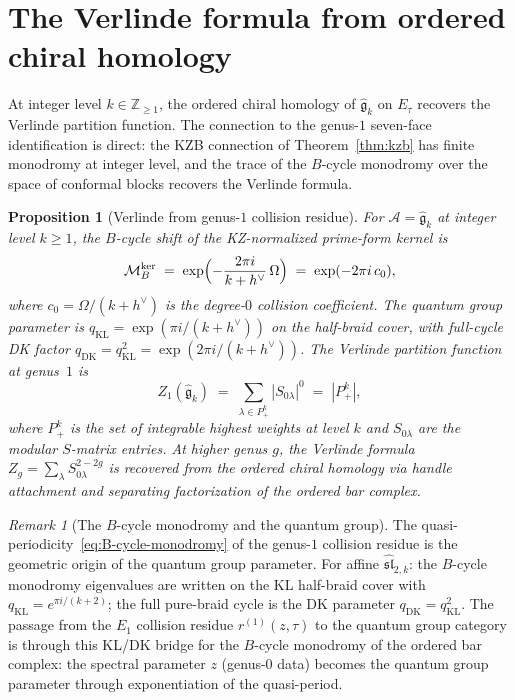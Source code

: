 \documentclass[11pt]{article}
\theoremstyle{plain}
\newtheorem{proposition}[theorem]{Proposition}
\theoremstyle{definition}
\theoremstyle{remark}
\newtheorem{remark}[theorem]{Remark}
\newcommand{\fg}{\mathfrak{g}}
\newcommand{\fsl}{\mathfrak{sl}}
\newcommand{\cA}{\mathcal{A}}
\numberwithin{equation}{section}
\begin{document}

\section{The Verlinde formula from ordered chiral
homology}\label{sec:verlinde}

At integer level $k \in \mathbb{Z}_{\geq 1}$, the ordered chiral
homology of $\widehat{\fg}_k$ on $E_\tau$ recovers the Verlinde
partition function. The connection to the genus-$1$ seven-face
identification is
direct: the KZB connection of Theorem~\ref{thm:kzb} has finite
monodromy at integer level, and the trace of the $B$-cycle monodromy
over the space of conformal blocks recovers the Verlinde formula.

\begin{proposition}[Verlinde from genus-$1$ collision
residue]\label{prop:verlinde-g1}
For $\cA = \widehat{\fg}_k$ at integer level $k \geq 1$, the $B$-cycle
shift of the KZ-normalized prime-form kernel is
\begin{equation}\label{eq:b-monodromy}
\mathcal{M}_{B}^{\mathrm{ker}}
\;=\;
\exp\Bigl(-\frac{2\pi i}{k+h^\vee}\,\Omega\Bigr)
\;=\;
\exp(-2\pi i\,c_0),
\end{equation}
where $c_0 = \Omega/(k+h^\vee)$ is the degree-$0$ collision
coefficient. The quantum group parameter is
\(q_{\mathrm{KL}}=\exp(\pi i/(k+h^\vee))\) on the half-braid cover,
with full-cycle DK factor
\(q_{\mathrm{DK}}=q_{\mathrm{KL}}^2
=\exp(2\pi i/(k+h^\vee))\). The Verlinde partition function
at genus~$1$ is
\begin{equation}\label{eq:verlinde-g1}
Z_1(\widehat{\fg}_k)
\;=\;
\sum_{\lambda \in P_+^k}
|S_{0\lambda}|^{0}
\;=\;
|P_+^k|,
\end{equation}
where $P_+^k$ is the set of integrable highest weights at level $k$
and $S_{0\lambda}$ are the modular $S$-matrix entries. At higher genus
$g$, the Verlinde formula
$Z_g = \sum_\lambda S_{0\lambda}^{2-2g}$ is recovered from the
ordered chiral homology via handle attachment and separating
factorization of the ordered bar complex.
\end{proposition}

\begin{remark}[The $B$-cycle monodromy and the quantum
group]\label{rem:quantum-group}
The quasi-periodicity~\eqref{eq:B-cycle-monodromy} of the genus-$1$
collision residue is the geometric origin of the quantum group
parameter. For affine $\widehat{\fsl}_{2,k}$: the $B$-cycle monodromy
eigenvalues are written on the KL half-braid cover with
\(q_{\mathrm{KL}}=e^{\pi i/(k+2)}\); the full pure-braid cycle is
the DK parameter \(q_{\mathrm{DK}}=q_{\mathrm{KL}}^2\). The passage from the
$E_1$ collision residue $r^{(1)}(z,\tau)$ to the quantum group
category is through this KL/DK bridge for the $B$-cycle monodromy of the ordered bar complex:
the spectral parameter $z$ (genus-$0$ data) becomes the quantum
group parameter through exponentiation of the
quasi-period.
\end{remark}
\end{document}
